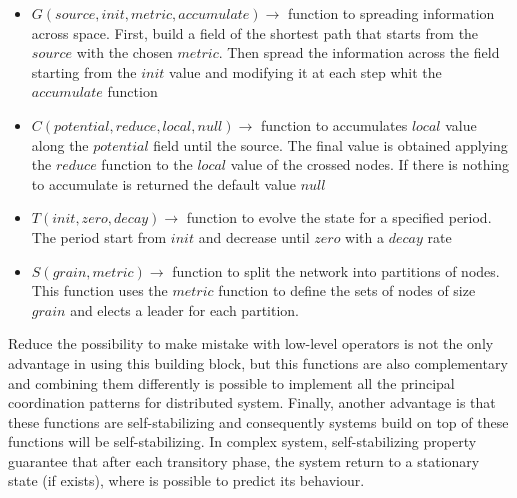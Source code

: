 \begin{itemize}
    \item $G(source, init, metric, accumulate) \rightarrow$ function to spreading information across space. First, build a field of the shortest path that starts from the $source$ with the chosen $metric$. Then spread the information across the field starting from the $init$ value and modifying it at each step whit the $accumulate$ function
    \item $C(potential, reduce, local, null) \rightarrow$ function to accumulates $local$ value along the $potential$ field until the source. The final value is obtained applying the $reduce$ function to the $local$ value of the crossed nodes. If there is nothing to accumulate is returned the default value $null$
    \item $T(init, zero, decay)  \rightarrow$ function to evolve the state for a specified period. The period start from $init$ and decrease until $zero$ with a $decay$ rate
    \item $S(grain, metric)  \rightarrow$ function to split the network into partitions of nodes. This function uses the $metric$ function to define the sets of nodes of size $grain$ and elects a leader for each partition.
\end{itemize}

Reduce the possibility to make mistake with low-level operators is not the only advantage in using this building block, but this functions are also complementary and combining them differently is possible to implement all the principal coordination patterns for distributed system. Finally, another advantage is that these functions are self-stabilizing and consequently systems build on top of these functions will be self-stabilizing. In complex system, self-stabilizing property guarantee that after each transitory phase, the system return to a stationary state (if exists), where is possible to predict its behaviour.


